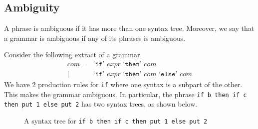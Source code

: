 \documentclass[a4paper, openany]{memoir}
\begin{document}
\subsection{Ambiguity}
A phrase is ambiguous if it has more than one syntax tree. Moreover, we say that a grammar is ambiguous if any of its phrases is ambiguous. 

Consider the following extract of a grammar.
\begin{align*}
    \textit{com} =& \text{ `}\texttt{if}\text{' } \textit{expr} \text{ `}\texttt{then}\text{' } \textit{com} \\
    |\hspace{2pt} & \text{ `}\texttt{if}\text{' } \textit{expr} \text{ `}\texttt{then}\text{' } \textit{com} \text{ `}\texttt{else}\text{' } \textit{com}
\end{align*}
\noindent We have 2 production rules for \texttt{if} where one syntax is a subpart of the other. This makes the grammar ambiguous. In particular, the phrase \texttt{if b then if c then put 1 else put 2} has two syntax trees, as shown below.
\begin{figure}[H]
    \centering
    \caption{A syntax tree for \texttt{if b then if c then put 1 else put 2}}
\end{figure}
\end{document}
